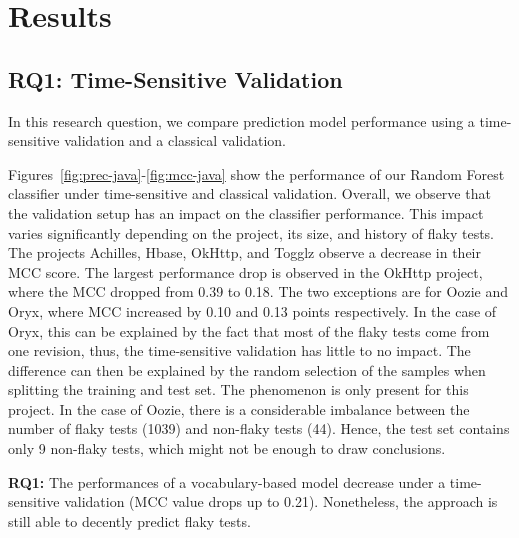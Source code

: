 \section{Results}
\label{sec:replication-results}

\subsection{RQ1: Time-Sensitive Validation}

In this research question, we compare prediction model performance using a time-sensitive validation and a classical validation.

Figures~\ref{fig:prec-java}-\ref{fig:mcc-java} show the performance of our Random Forest classifier under time-sensitive and classical validation. 
Overall, we observe that the validation setup has an impact on the classifier performance.
This impact varies significantly depending on the project, its size, and history of flaky tests.
The projects Achilles, Hbase, OkHttp, and Togglz observe a decrease in their MCC score.
The largest performance drop is observed in the OkHttp project, where the MCC dropped from 0.39 to 0.18.
The two exceptions are for Oozie and Oryx, where MCC increased by 0.10 and 0.13 points respectively. 
In the case of Oryx, this can be explained by the fact that most of the flaky tests come from one revision, thus, the time-sensitive validation has little to no impact. 
The difference can then be explained by the random selection of the samples when splitting the training and test set. 
The phenomenon is only present for this project.
In the case of Oozie, there is a considerable imbalance between the number of flaky tests (1039) and non-flaky tests (44). 
Hence, the test set contains only 9 non-flaky tests, which might not be enough to draw conclusions.\\

\begin{tcolorbox}[
    left=2pt,right=2pt,top=2pt,bottom=2pt,
    arc=0pt,
    boxrule=1.2pt
]
\textbf{RQ1:} The performances of a vocabulary-based model decrease under a time-sensitive validation (MCC value drops up to 0.21).
Nonetheless, the approach is still able to decently predict flaky tests.
\end{tcolorbox}

